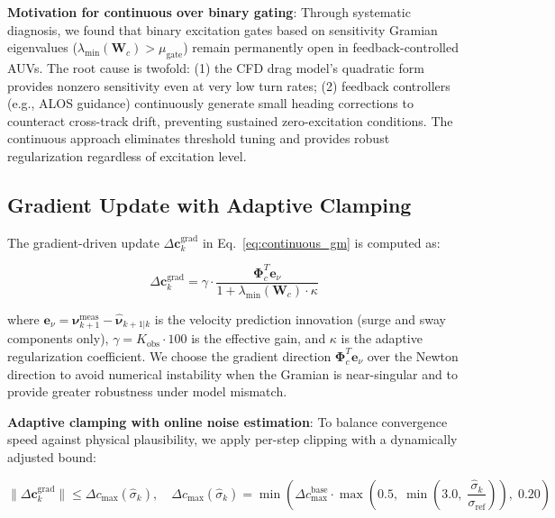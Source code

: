 \textbf{Motivation for continuous over binary gating}: Through systematic diagnosis, we found that binary excitation gates based on sensitivity Gramian eigenvalues ($\lambda_{\min}(\bm{W}_c) > \mu_{\text{gate}}$) remain permanently open in feedback-controlled AUVs. The root cause is twofold: (1) the CFD drag model's quadratic form provides nonzero sensitivity even at very low turn rates; (2) feedback controllers (e.g., ALOS guidance) continuously generate small heading corrections to counteract cross-track drift, preventing sustained zero-excitation conditions. The continuous approach eliminates threshold tuning and provides robust regularization regardless of excitation level.

\subsection{Gradient Update with Adaptive Clamping}

The gradient-driven update $\Delta\bm{c}_k^{\text{grad}}$ in Eq.~\eqref{eq:continuous_gm} is computed as:

\begin{equation}
    \Delta\bm{c}_k^{\text{grad}} = \gamma \cdot \frac{\bm{\Phi}_c^T \bm{e}_{\nu}}{1 + \lambda_{\min}(\bm{W}_c) \cdot \kappa}
    \label{eq:update}
\end{equation}

where $\bm{e}_{\nu} = \bm{\nu}_{k+1}^{\text{meas}} - \hat{\bm{\nu}}_{k+1|k}$ is the velocity prediction innovation (surge and sway components only), $\gamma = K_{\text{obs}} \cdot 100$ is the effective gain, and $\kappa$ is the adaptive regularization coefficient. We choose the gradient direction $\bm{\Phi}_c^T\bm{e}_{\nu}$ over the Newton direction to avoid numerical instability when the Gramian is near-singular and to provide greater robustness under model mismatch.

\textbf{Adaptive clamping with online noise estimation}: To balance convergence speed against physical plausibility, we apply per-step clipping with a dynamically adjusted bound:

\begin{equation}
    \|\Delta\bm{c}_k^{\text{grad}}\| \leq \Delta c_{\max}(\hat{\sigma}_k), \quad \Delta c_{\max}(\hat{\sigma}_k) = \min\left(\Delta c_{\max}^{\text{base}} \cdot \max\left(0.5,\; \min\left(3.0,\; \frac{\hat{\sigma}_k}{\sigma_{\text{ref}}}\right)\right),\; 0.20\right)
    \label{eq:adaptive_clamp}
\end{equation}

